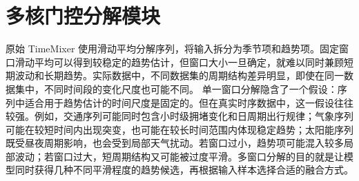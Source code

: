 \section{多核门控分解模块}

原始 TimeMixer 使用滑动平均分解序列，将输入拆分为季节项和趋势项。固定窗口滑动平均可以得到较稳定的趋势估计，但窗口大小一旦确定，就难以同时兼顾短期波动和长期趋势。实际数据中，不同数据集的周期结构差异明显，即使在同一数据集中，不同时间段的变化尺度也可能不同。
单一窗口分解隐含了一个假设：序列中适合用于趋势估计的时间尺度是固定的。但在真实时序数据中，这一假设往往较强。例如，交通序列可能同时包含小时级拥堵变化和日周期出行规律；气象序列可能在较短时间内出现突变，也可能在较长时间范围内体现稳定趋势；太阳能序列既受昼夜周期影响，也会受到局部天气扰动。若窗口过小，趋势项可能混入较多局部波动；若窗口过大，短周期结构又可能被过度平滑。多窗口分解的目的就是让模型同时获得几种不同平滑程度的趋势候选，再根据输入样本选择合适的融合方式。

